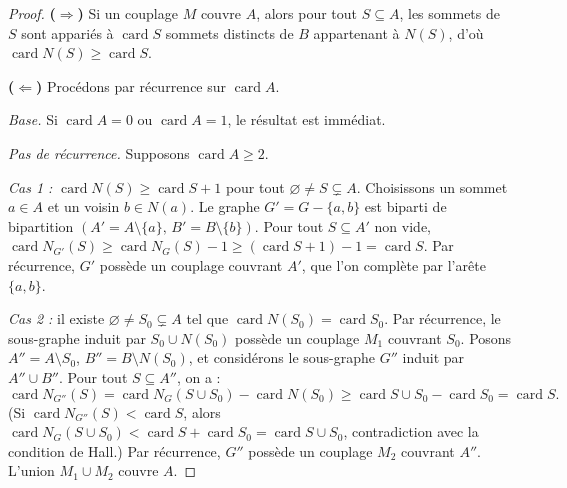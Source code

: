 \documentclass[12pt,a4paper,openany]{book}
\theoremstyle{definition}
\theoremstyle{plain}
\theoremstyle{remark}
\DeclareMathOperator{\card}{card}
\begin{document}
\begin{proof}
\textbf{($\Rightarrow$)}\;
Si un couplage $M$ couvre $A$, alors pour tout $S \subseteq A$, les
sommets de $S$ sont appariés à $\card{S}$ sommets distincts de $B$
appartenant à $N(S)$, d'où $\card{N(S)} \geq \card{S}$.

\medskip\noindent
\textbf{($\Leftarrow$)}\;
Procédons par récurrence sur $\card{A}$.

\emph{Base.} Si $\card{A} = 0$ ou $\card{A}= 1$, le résultat est immédiat.

\emph{Pas de récurrence.} Supposons $\card{A} \geq 2$.

\emph{Cas 1 :} $\card{N(S)} \geq \card{S} + 1$ pour tout
$\varnothing \neq S \subsetneq A$. Choisissons un sommet $a \in A$ et un
voisin $b \in N(a)$. Le graphe $G' = G - \{a,b\}$ est biparti de
bipartition $(A' = A \setminus\{a\},\, B' = B \setminus\{b\})$. Pour
tout $S \subseteq A'$ non vide, $\card{N_{G'}(S)} \geq \card{N_G(S)} - 1
\geq (\card{S}+1) - 1 = \card{S}$. Par récurrence, $G'$ possède un
couplage couvrant $A'$, que l'on complète par l'arête $\{a,b\}$.

\emph{Cas 2 :} il existe $\varnothing \neq S_0 \subsetneq A$ tel que
$\card{N(S_0)} = \card{S_0}$. Par récurrence, le sous-graphe induit par
$S_0 \cup N(S_0)$ possède un couplage $M_1$ couvrant $S_0$. Posons
$A'' = A \setminus S_0$, $B'' = B \setminus N(S_0)$, et considérons le
sous-graphe $G''$ induit par $A'' \cup B''$. Pour tout $S \subseteq A''$,
on a :
\[
  \card{N_{G''}(S)} = \card{N_G(S \cup S_0)} - \card{N(S_0)}
  \geq \card{S \cup S_0} - \card{S_0} = \card{S}.
\]
(Si $\card{N_{G''}(S)} < \card{S}$, alors
$\card{N_G(S \cup S_0)} < \card{S} + \card{S_0} = \card{S \cup S_0}$,
contradiction avec la condition de Hall.) Par récurrence, $G''$ possède
un couplage $M_2$ couvrant $A''$. L'union $M_1 \cup M_2$ couvre $A$.
\end{proof}
\end{document}
